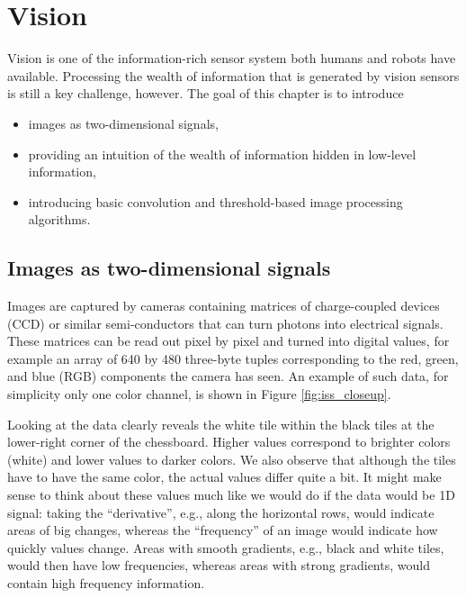 \chapter{Vision}\label{chap:vision}
Vision is one of the information-rich sensor system both humans and robots have available. Processing the wealth of information that is generated by vision sensors is still a key challenge, however. The goal of this chapter is to introduce
\begin{itemize}
\item images as two-dimensional signals,
\item providing an intuition of the wealth of information hidden in low-level information,
\item introducing basic convolution and threshold-based image processing algorithms.
\end{itemize}

\section{Images as two-dimensional signals}
Images are captured by cameras containing matrices of charge-coupled devices (CCD) or similar semi-conductors that can turn photons into electrical signals. These matrices can be read out pixel by pixel and turned into digital values, for example an array of 640 by 480 three-byte tuples corresponding to the red, green, and blue (RGB) components the camera has seen. An example of such data, for simplicity only one color channel, is shown in Figure \ref{fig:iss_closeup}. 

Looking at the data clearly reveals the white tile within the black tiles at the lower-right corner of the chessboard. Higher values correspond to brighter colors (white) and lower values to darker colors. We also observe that although the tiles have to have the same color, the actual values differ quite a bit. It might make sense to think about these values much like we would do if the data would be 1D signal: taking the ``derivative'', e.g., along the horizontal rows, would indicate areas of big changes, whereas the ``frequency'' of an image  would indicate how quickly values change. Areas with smooth gradients, e.g., black and white tiles, would then have low frequencies, whereas areas with strong gradients, would contain high frequency information. 

